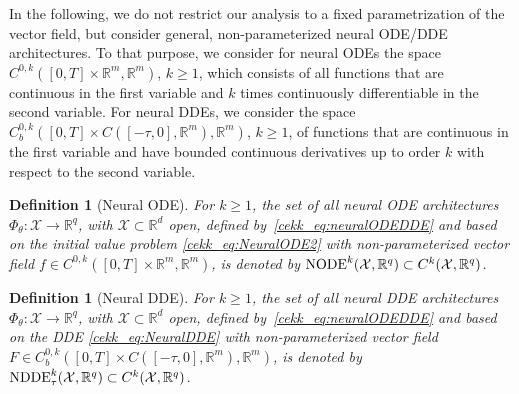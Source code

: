 \documentclass[10pt]{article}
\newcommand{\R}{{\mathbb R}}
\def\R{\mathbb{R}}
\newtheorem{definition}[theorem]{Definition}
\begin{document}
In the following, we do not restrict our analysis to a fixed parametrization of the vector field, but consider general, non-parameterized neural ODE/DDE architectures. To that purpose, we consider for neural ODEs the space $C^{0,k}([0,T]\times \mathbb{R}^m,\mathbb{R}^m)$, $k \geq 1$, which consists of all functions that are continuous in the first variable and $k$ times continuously differentiable in the second variable. For neural DDEs, we consider the space $C^{0,k}_b([0,T]\times C([-\tau,0],\R^m),\mathbb{R}^m)$, $k \geq 1$, of functions that are continuous in the first variable and have bounded continuous derivatives up to order $k$ with respect to the second variable.

\begin{definition}[Neural ODE] \label{cekk_def:NODE}
	For $k \geq 1$, the set of all neural ODE architectures $\Phi_\theta: \mathcal{X}\rightarrow \mathbb{R}^q$, with $\mathcal{X} \subset \R^d$ open, defined by~\eqref{cekk_eq:neuralODEDDE} and based on the initial value problem \eqref{cekk_eq:NeuralODE2} with non-parameterized vector field $f\in C^{0,k}([0,T]\times \mathbb{R}^m,\mathbb{R}^m)$, is denoted by $\textup{NODE}^k(\mathcal{X},\R^q) \subset C^k(\mathcal{X},\R^q)$. 
\end{definition}


\begin{definition}[Neural DDE] \label{cekk_def:NDDE}
	For $k \geq 1$, the set of all neural DDE architectures $\Phi_\theta: \mathcal{X}\rightarrow \mathbb{R}^q$, with $\mathcal{X}\subset \R^d$ open, defined by~\eqref{cekk_eq:neuralODEDDE} and based on the DDE \eqref{cekk_eq:NeuralDDE} with non-parameterized vector field $F\in C^{0,k}_b([0,T]\times C([-\tau,0],\R^m),\mathbb{R}^m)$, is denoted by $\textup{NDDE}_\tau^k(\mathcal{X},\R^q) \subset C^k(\mathcal{X},\R^q)$. 
\end{definition}
\end{document}
